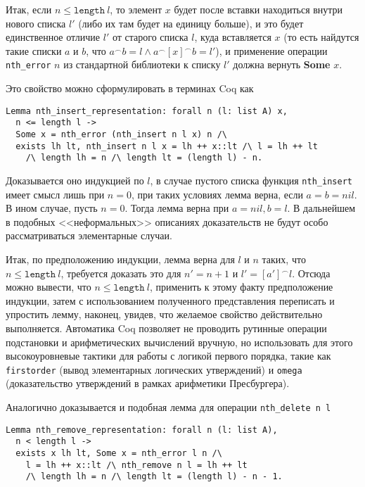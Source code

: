 Итак, если $n \leq \texttt{length}\ l$, то элемент $x$ будет после вставки находиться внутри нового списка $l'$ (либо их там будет на единицу больше), и это будет единственное отличие $l'$ от старого списка $l$, куда вставляется $x$ (то есть найдутся такие списки $a$ и $b$, что $a^\frown  b = l \wedge a^\frown [x]^\frown b = l'$),  и применение операции \texttt{nth\_error} $n$ из стандартной библиотеки к списку $l'$ должна вернуть \textbf{Some} $x$.

Это свойство можно сформулировать в терминах Coq как
\begin{Verbatim}[fontsize=\small]
Lemma nth_insert_representation: forall n (l: list A) x,
  n <= length l ->
  Some x = nth_error (nth_insert n l x) n /\
  exists lh lt, nth_insert n l x = lh ++ x::lt /\ l = lh ++ lt
    /\ length lh = n /\ length lt = (length l) - n.
 \end{Verbatim}

Доказывается оно индукцией по $l$, в случае пустого списка функция \texttt{nth\_insert} имеет смысл лишь при $n = 0$, при таких условиях лемма верна, если $a = b = nil$. В ином случае, пусть $n = 0$. Тогда лемма верна при $a = nil, b = l$. В дальнейшем в подобных <<неформальных>> описаниях доказательств не будут особо рассматриваться элементарные случаи.

Итак, по предположению индукции, лемма верна для $l$ и $n$ таких, что $n \leq \texttt{length}\ l$, требуется доказать это для $n' = n + 1$ и $l' = [a']^\frown l$. Отсюда можно вывести, что $n \leq \texttt{length}\ l$, применить к этому факту предположение индукции, затем с использованием полученного представления переписать и упростить лемму, наконец, увидев, что желаемое свойство действительно выполняется. Автоматика Coq позволяет не проводить рутинные операции подстановки и арифметических вычислений вручную, но использовать для этого высокоуровневые тактики для работы с логикой первого порядка, такие как \texttt{firstorder} (вывод элементарных логических утверждений) и \texttt{omega} (доказательство утверждений в рамках арифметики Пресбургера).

Аналогично доказывается и подобная лемма для операции \texttt{nth\_delete n l}
\begin{Verbatim}[fontsize=\small]
Lemma nth_remove_representation: forall n (l: list A),
  n < length l ->
  exists x lh lt, Some x = nth_error l n /\
    l = lh ++ x::lt /\ nth_remove n l = lh ++ lt
    /\ length lh = n /\ length lt = (length l) - n - 1.
\end{Verbatim}

